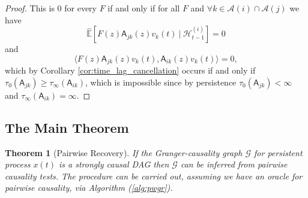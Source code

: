 \documentclass{statsoc}
\def\gcg{\mathcal{G}}  %
\def\A{\mathsf{A}}  %
\def\H{\mathcal{H}}  %
\newcommand{\linE}[2]{\hat{\E}[#1\ |\ #2]}  %
\newcommand{\anc}[1]{\mathcal{A}(#1)}  %
\newtheorem{theorem}{Theorem}
\def\H{\mathcal{H}}  %
\def\E{\mathbb{E}}  %
\newcommand{\inner}[2]{\langle #1, #2 \rangle}  %
\begin{document}
\begin{proof}

  This is $0$ for every $F$ if and only if for all $F$ and
  $\forall k \in \anc{i} \cap \anc{j}$ we have
  $$\linE{F(z)\A_{jk}(z)v_k(t)}{\H_{t - 1}^{(i)}} = 0$$ and
  $$\inner{F(z)\A_{jk}(z)v_k(t)}{\A_{ik}(z)v_k(t)} = 0,$$ which by
  Corollary \ref{cor:time_lag_cancellation} occurs if and only if
  $\tau_0(\A_{jk}) \ge \tau_\infty(\A_{ik})$, which is impossible since by persistence
  $\tau_0(\A_{jk}) < \infty$ and  $\tau_\infty(\A_{ik}) = \infty$.
\end{proof}

\subsection{The Main Theorem}
\label{apx:proof_main_theorem}

\begin{theorem}[Pairwise Recovery]
  \label{thm:scg_recovery}
  If the Granger-causality graph $\gcg$ for persistent process $x(t)$
  is a strongly causal DAG then $\gcg$ can be inferred from pairwise
  causality tests.  The procedure can be carried out, assuming
  we have an oracle for pairwise causality, via Algorithm
  (\ref{alg:pwgr}).
\end{theorem}
\end{document}
